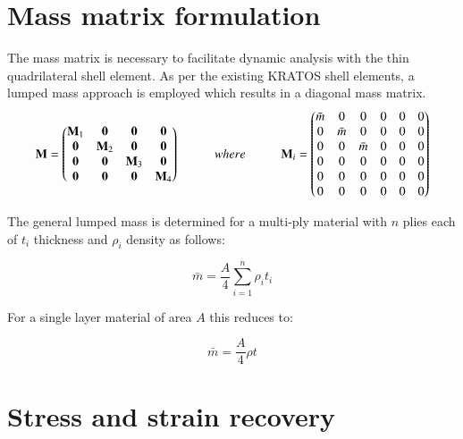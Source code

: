 \section{Mass matrix formulation}

The mass matrix is necessary to facilitate dynamic analysis with the thin quadrilateral shell element. As per the existing KRATOS shell elements, a lumped mass approach is employed which results in a diagonal mass matrix.
\begin{equation} 
\mathbf{M} =  
\begin{pmatrix}
\mathbf{M}_1 & \mathbf{0} & \mathbf{0} & \mathbf{0}\\
\mathbf{0} & \mathbf{M}_2 & \mathbf{0} & \mathbf{0}\\
\mathbf{0} & \mathbf{0} & \mathbf{M}_3 & \mathbf{0}\\
\mathbf{0} &\mathbf{0} & \mathbf{0} & \mathbf{M}_4
\end{pmatrix}
\hspace{10mm}
where
\hspace{10mm}
\mathbf{M}_i =  
\begin{pmatrix}
\bar{m} & 0 & 0 & 0 & 0 & 0\\
0 & \bar{m} & 0 & 0 & 0 & 0\\
0 & 0 & \bar{m} &0 & 0 & 0\\
0 & 0 & 0 & 0 & 0 & 0\\
0 & 0 & 0 & 0 & 0 & 0\\
0 & 0 & 0 & 0 & 0 & 0
\end{pmatrix}
\label{eqt15}
\end{equation}

The general lumped mass is determined for a multi-ply material with $n$ plies each of $t_i$ thickness and $\rho_i$ density as follows:

\begin{equation} 
\bar{m} = \frac{A}{4} \sum_{i=1}^n \rho_i t_i
\label{eqt16}
\end{equation}

For a single layer material of area $A$ this reduces to:

\begin{equation} 
\bar{m} = \frac{A}{4} \rho t
\label{eqt17}
\end{equation}

\section{Stress and strain recovery}

